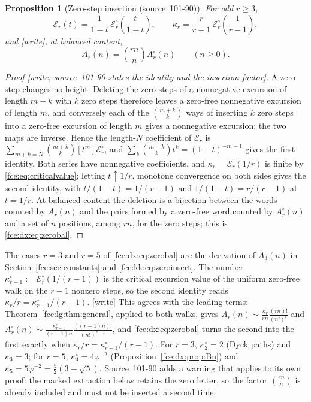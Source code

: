 \documentclass[11pt,a4paper]{article}
\numberwithin{equation}{section}
\newtheorem{proposition}[theorem]{Proposition}
\theoremstyle{definition}\newtheorem{definition}[theorem]{Definition}
\theoremstyle{remark}\newtheorem{remark}[theorem]{Remark}
\newcommand{\E}{\mathcal E}
\begin{document}
\begin{proposition}[Zero-step insertion (source~101-90)]\label{fce:dx:prop:zero}
For odd $r\ge3$,
\begin{equation}\label{fce:dx:eq:zero}
 \E_r(t)=\frac1{1-t}\,\E^\circ_r\!\left(\frac t{1-t}\right),\qquad
 \kappa_r=\frac r{r-1}\,\E^\circ_r\!\left(\frac1{r-1}\right),
\end{equation}
and \textup{[write]}, at balanced content,
\begin{equation}\label{fce:dx:eq:zerobal}
 A_r(n)=\binom{rn}{n}A^\circ_r(n)\qquad(n\ge0).
\end{equation}
\end{proposition}
\begin{proof}[Proof \textup{[write; source~101-90 states the identity and the insertion factor]}]
A zero step changes no height. Deleting the zero steps of a nonnegative
excursion of length $m+k$ with $k$ zero steps therefore leaves a zero-free
nonnegative excursion of length $m$, and conversely each of the
$\binom{m+k}k$ ways of inserting $k$ zero steps into a zero-free excursion
of length $m$ gives a nonnegative excursion; the two maps are inverse.
Hence the length-$N$ coefficient of $\E_r$ is
$\sum_{m+k=N}\binom{m+k}k[t^m]\E^\circ_r$, and
$\sum_k\binom{m+k}kt^k=(1-t)^{-m-1}$ gives the first identity. Both series
have nonnegative coefficients, and $\kappa_r=\E_r(1/r)$ is finite by
\eqref{fce:eq:criticalvalue}; letting $t\uparrow1/r$, monotone convergence
on both sides gives the second identity, with $t/(1-t)=1/(r-1)$ and
$1/(1-t)=r/(r-1)$ at $t=1/r$. At balanced content the deletion is a bijection
between the words counted by $A_r(n)$ and the pairs formed by a zero-free
word counted by $A^\circ_r(n)$ and a set of $n$ positions, among $rn$, for
the zero steps; this is \eqref{fce:dx:eq:zerobal}.
\end{proof}
The cases $r=3$ and $r=5$ of \eqref{fce:dx:eq:zerobal} are the derivation of
$A_3(n)$ in Section~\ref{fce:sec:constants} and
\eqref{fce:kk:eq:zeroinsert}. The number $\kappa^\circ_{r-1}:=\E^\circ_r(1/(r-1))$
is the critical excursion value of the uniform zero-free walk on the $r-1$
nonzero steps, so the second identity reads
$\kappa_r/r=\kappa^\circ_{r-1}/(r-1)$. \textup{[write]} This agrees with the
leading terms: Theorem~\ref{fce:lg:thm:general}, applied to both walks, gives
$A_r(n)\sim\frac{\kappa_r}{rn}\frac{(rn)!}{(n!)^r}$ and
$A^\circ_r(n)\sim\frac{\kappa^\circ_{r-1}}{(r-1)n}\frac{((r-1)n)!}{(n!)^{r-1}}$,
and \eqref{fce:dx:eq:zerobal} turns the second into the first exactly when
$\kappa_r/r=\kappa^\circ_{r-1}/(r-1)$. For $r=3$, $\kappa^\circ_2=2$ (Dyck
paths) and $\kappa_3=3$; for $r=5$, $\kappa^\circ_4=4\varphi^{-2}$
(Proposition~\ref{fce:dx:prop:Bn}) and $\kappa_5=5\varphi^{-2}=\frac52(3-\sqrt5)$.
Source~101-90 adds a warning that applies to its own proof: the marked
extraction below retains the zero letter, so the factor $\binom{rn}n$ is
already included and must not be inserted a second time.
\end{document}
